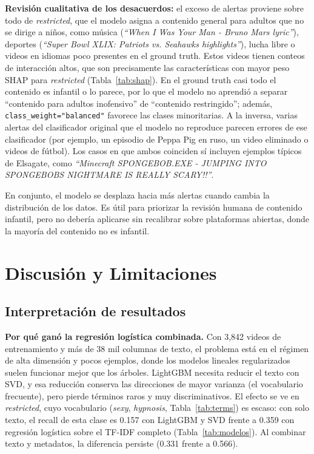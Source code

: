 \documentclass[conference]{IEEEtran}
\begin{document}
\textbf{Revisión cualitativa de los desacuerdos:} el exceso de alertas proviene sobre todo de \textit{restricted}, que el modelo asigna a contenido general para adultos que no se dirige a niños, como música (\emph{``When I Was Your Man - Bruno Mars lyric''}), deportes (\emph{``Super Bowl XLIX: Patriots vs. Seahawks highlights''}), lucha libre o videos en idiomas poco presentes en el ground truth. Estos videos tienen conteos de interacción altos, que son precisamente las características con mayor peso SHAP para \textit{restricted} (Tabla~\ref{tab:shap}). En el ground truth casi todo el contenido es infantil o lo parece, por lo que el modelo no aprendió a separar ``contenido para adultos inofensivo'' de ``contenido restringido''; además, \texttt{class\_weight="balanced"} favorece las clases minoritarias. A la inversa, varias alertas del clasificador original que el modelo no reproduce parecen errores de ese clasificador (por ejemplo, un episodio de Peppa Pig en ruso, un video eliminado o videos de fútbol). Los casos en que ambos coinciden sí incluyen ejemplos típicos de Elsagate, como \emph{``Minecraft SPONGEBOB.EXE - JUMPING INTO SPONGEBOBS NIGHTMARE IS REALLY SCARY!!''}.

En conjunto, el modelo se desplaza hacia más alertas cuando cambia la distribución de los datos. Es útil para priorizar la revisión humana de contenido infantil, pero no debería aplicarse sin recalibrar sobre plataformas abiertas, donde la mayoría del contenido no es infantil.

\section{Discusión y Limitaciones}\label{sec:discusion}

\subsection{Interpretación de resultados}\label{sec:interp}
\textbf{Por qué ganó la regresión logística combinada.} Con 3,842 videos de entrenamiento y más de 38 mil columnas de texto, el problema está en el régimen de alta dimensión y pocos ejemplos, donde los modelos lineales regularizados suelen funcionar mejor que los árboles. LightGBM necesita reducir el texto con SVD, y esa reducción conserva las direcciones de mayor varianza (el vocabulario frecuente), pero pierde términos raros y muy discriminativos. El efecto se ve en \textit{restricted}, cuyo vocabulario (\textit{sexy}, \textit{hypnosis}, Tabla~\ref{tab:terms}) es escaso: con solo texto, el recall de esta clase es 0.157 con LightGBM y SVD frente a 0.359 con regresión logística sobre el TF-IDF completo (Tabla~\ref{tab:modelos}). Al combinar texto y metadatos, la diferencia persiste (0.331 frente a 0.566).
\end{document}
